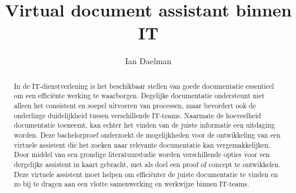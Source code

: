 \documentclass{hogent-article}
\title{Virtual document assistant binnen IT}
\author{Ian Daelman}
\begin{document}
\begin{abstract}
  
  In de IT-dienstverlening is het beschikbaar stellen van goede documentatie essentieel om een efficiënte werking te waarborgen. Degelijke documentatie ondersteunt niet alleen het consistent en soepel uitvoeren van processen, maar bevordert ook de onderlinge duidelijkheid tussen verschillende IT-teams. Naarmate de hoeveelheid documentatie toeneemt, kan echter het vinden van de juiste informatie een uitdaging worden. Deze bachelorproef onderzoekt de mogelijkheden voor de ontwikkeling van een virtuele assistent die het zoeken naar relevante documentatie kan vergemakkelijken. Door middel van een grondige literatuurstudie worden verschillende opties voor een dergelijke assistent in kaart gebracht, met als doel een proof of concept te ontwikkelen. Deze virtuele assistent moet helpen om efficiënter de juiste documentatie te vinden en zo bij te dragen aan een vlotte samenwerking en werkwijze binnen IT-teams. 
  
 
\end{abstract}

\tableofcontents



\printbibliography[heading=bibintoc]
\end{document}
